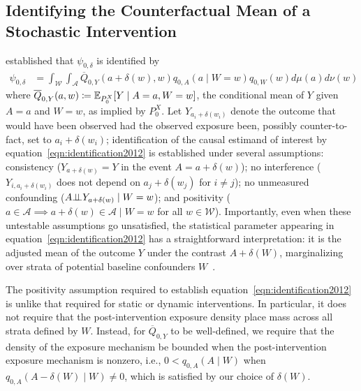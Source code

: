 \subsection{Identifying the Counterfactual Mean of a Stochastic
Intervention}\label{stoch_lit}

\citet{diaz2012population} established that $\psi_{0,\delta}$ is
identified by
\begin{align}\label{eqn:identification2012}
  \psi_{0,\delta} &= \int_{\mathcal{W}} \int_{\mathcal{A}}
  \overline{Q}_{0,Y}(a + \delta(w), w) q_{0, A}(a \mid W = w)
  q_{0, W}(w) d\mu(a)d\nu(w)
\end{align}
where $\overline{Q}_{0,Y}(a,w) \coloneqq \mathbb{E}_{P_0^X}[Y \mid A = a, W = w]$, the
conditional mean of $Y$ given $A = a$ and $W = w$, as implied by $P_0^X$. Let
$Y_{a_i + \delta(w_i)}$ denote the outcome that would have been observed had the
observed exposure been, possibly counter-to-fact, set to $a_i + \delta(w_i)$;
identification of the causal estimand of interest by
equation~\ref{eqn:identification2012} is established under several assumptions:
consistency ($Y_{a + \delta(w)} = Y$ in the event $A = a + \delta(w)$); no
interference ($Y_{i, a_i + \delta(w_i)}$ does not depend on $a_j + \delta(w_j)$
for $i \neq j$); no unmeasured confounding ($A \mbox{$\perp\!\!\!\perp$} Y_{a + \delta(w)} \mid
W = w$); and positivity ($a \in \mathcal{A} \implies a + \delta(w) \in
\mathcal{A} \mid W = w$ for all $w \in \mathcal{W}$). Importantly, even when
these untestable assumptions go unsatisfied, the statistical parameter appearing
in equation~\ref{eqn:identification2012} has a straightforward interpretation:
it is the adjusted mean of the outcome $Y$ under the contrast $A + \delta(W)$,
marginalizing over strata of potential baseline confounders
$W$~\citep{diaz2012population, vdl2011targeted}.

The positivity assumption required to establish
equation~\ref{eqn:identification2012} is unlike that required for static or
dynamic interventions. In particular, it does not require that the
post-intervention exposure density place mass across all strata defined by $W$.
Instead, for $\overline{Q}_{0,Y}$ to be well-defined, we require that the
density of the exposure mechanism be bounded when the post-intervention exposure
mechanism is nonzero, i.e., $0 < q_{0,A}(A \mid W)$ when $q_{0,A}(A - \delta(W)
\mid W) \neq 0$, which is satisfied by our choice of $\delta(W)$.

